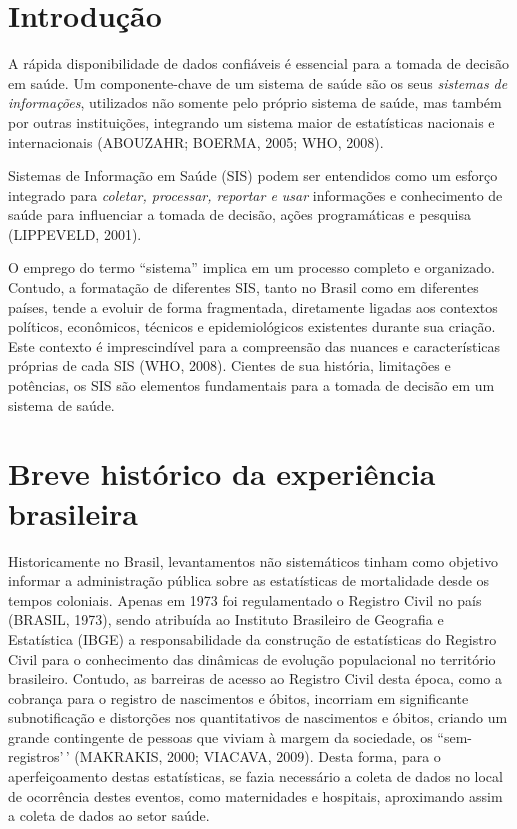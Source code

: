\documentclass[
  letterpaper,
  DIV=11,
  numbers=noendperiod]{scrreprt}
\begin{document}
\chapter{Introdução}\label{introduuxe7uxe3o}

A rápida disponibilidade de dados confiáveis é essencial para a tomada
de decisão em saúde. Um componente-chave de um sistema de saúde são os
seus \emph{sistemas de informações}, utilizados não somente pelo próprio
sistema de saúde, mas também por outras instituições, integrando um
sistema maior de estatísticas nacionais e internacionais (ABOUZAHR;
BOERMA, 2005; WHO, 2008).

\begin{tcolorbox}[enhanced jigsaw, arc=.35mm, bottomrule=.15mm, breakable, opacityback=0, rightrule=.15mm, toprule=.15mm, leftrule=.75mm, colframe=quarto-callout-color-frame, left=2mm, colback=white]

Sistemas de Informação em Saúde (SIS) podem ser entendidos como um
esforço integrado para \emph{coletar, processar, reportar e usar}
informações e conhecimento de saúde para influenciar a tomada de
decisão, ações programáticas e pesquisa (LIPPEVELD, 2001).

\end{tcolorbox}

O emprego do termo ``sistema'' implica em um processo completo e
organizado. Contudo, a formatação de diferentes SIS, tanto no Brasil
como em diferentes países, tende a evoluir de forma fragmentada,
diretamente ligadas aos contextos políticos, econômicos, técnicos e
epidemiológicos existentes durante sua criação. Este contexto é
imprescindível para a compreensão das nuances e características próprias
de cada SIS (WHO, 2008). Cientes de sua história, limitações e
potências, os SIS são elementos fundamentais para a tomada de decisão em
um sistema de saúde.


\chapter{Breve histórico da experiência
brasileira}\label{breve-histuxf3rico-da-experiuxeancia-brasileira}

Historicamente no Brasil, levantamentos não sistemáticos tinham como
objetivo informar a administração pública sobre as estatísticas de
mortalidade desde os tempos coloniais. Apenas em 1973 foi regulamentado
o Registro Civil no país (BRASIL, 1973), sendo atribuída ao Instituto
Brasileiro de Geografia e Estatística (IBGE) a responsabilidade da
construção de estatísticas do Registro Civil para o conhecimento das
dinâmicas de evolução populacional no território brasileiro. Contudo, as
barreiras de acesso ao Registro Civil desta época, como a cobrança para
o registro de nascimentos e óbitos, incorriam em significante
subnotificação e distorções nos quantitativos de nascimentos e óbitos,
criando um grande contingente de pessoas que viviam à margem da
sociedade, os ``sem-registros'\,' (MAKRAKIS, 2000; VIACAVA, 2009). Desta
forma, para o aperfeiçoamento destas estatísticas, se fazia necessário a
coleta de dados no local de ocorrência destes eventos, como maternidades
e hospitais, aproximando assim a coleta de dados ao setor saúde.
\end{document}

